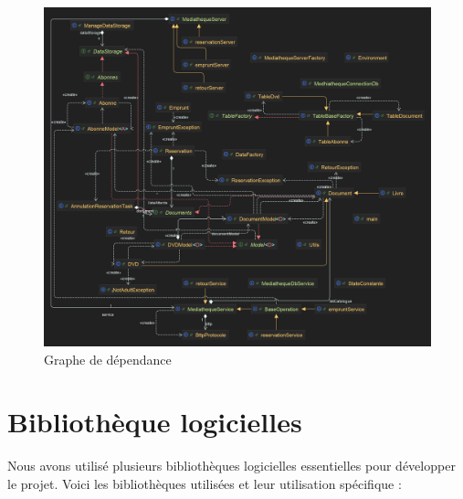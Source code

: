     \begin{figure}[H]
        \centering
        \includegraphics[width=1.1\textwidth]{image/uml5}
        \caption{Graphe de dépendance}
        \label{fig:dependency_graph}
    \end{figure}

    \clearpage

    \section{Bibliothèque logicielles}

    \bigskip


    Nous avons utilisé plusieurs bibliothèques logicielles essentielles pour développer le projet.
    Voici les bibliothèques utilisées et leur utilisation spécifique :

    \bigskip

